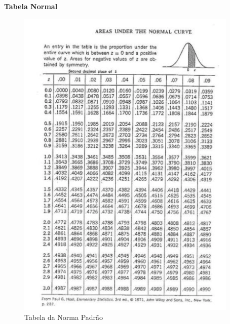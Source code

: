\documentclass[
  letterpaper,
  DIV=11,
  numbers=noendperiod]{scrreprt}
\begin{document}
\begin{tcolorbox}[enhanced jigsaw, bottomrule=.15mm, leftrule=.75mm, arc=.35mm, colframe=quarto-callout-note-color-frame, breakable, opacityback=0, toprule=.15mm, colback=white, left=2mm, rightrule=.15mm]
\begin{minipage}[t]{5.5mm}
\textcolor{quarto-callout-note-color}{\faInfo}
\end{minipage}%
\begin{minipage}[t]{\textwidth - 5.5mm}

\vspace{-3mm}\textbf{Tabela Normal}\vspace{3mm}

\begin{figure}[H]

{\centering \includegraphics[width=0.8\linewidth,height=\textheight,keepaspectratio]{figuras/normal.png}

}

\caption{Tabela da Norma Padrão \label{normal_z}}

\end{figure}%

\end{minipage}%
\end{tcolorbox}
\end{document}

